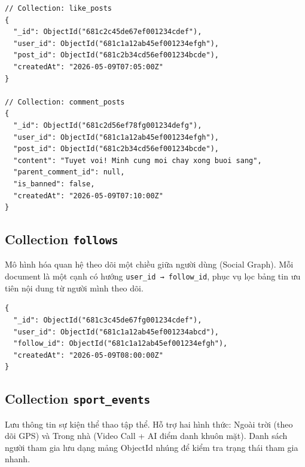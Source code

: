 \begin{verbatim}
// Collection: like_posts
{
  "_id": ObjectId("681c2c45de67ef001234cdef"),
  "user_id": ObjectId("681c1a12ab45ef001234efgh"),
  "post_id": ObjectId("681c2b34cd56ef001234bcde"),
  "createdAt": "2026-05-09T07:05:00Z"
}

// Collection: comment_posts
{
  "_id": ObjectId("681c2d56ef78fg001234defg"),
  "user_id": ObjectId("681c1a12ab45ef001234efgh"),
  "post_id": ObjectId("681c2b34cd56ef001234bcde"),
  "content": "Tuyet voi! Minh cung moi chay xong buoi sang",
  "parent_comment_id": null,
  "is_banned": false,
  "createdAt": "2026-05-09T07:10:00Z"
}
\end{verbatim}

\subsection{Collection \texttt{follows}}
\label{subsec:col_follows}

Mô hình hóa quan hệ theo dõi một chiều giữa người dùng (Social Graph). Mỗi document là một cạnh có hướng \texttt{user\_id → follow\_id}, phục vụ lọc bảng tin ưu tiên nội dung từ người mình theo dõi.

\begin{verbatim}
{
  "_id": ObjectId("681c3c45de67fg001234cdef"),
  "user_id": ObjectId("681c1a12ab45ef001234abcd"),
  "follow_id": ObjectId("681c1a12ab45ef001234efgh"),
  "createdAt": "2026-05-09T08:00:00Z"
}
\end{verbatim}

\subsection{Collection \texttt{sport\_events}}
\label{subsec:col_sport_events}

Lưu thông tin sự kiện thể thao tập thể. Hỗ trợ hai hình thức: Ngoài trời (theo dõi GPS) và Trong nhà (Video Call + AI điểm danh khuôn mặt). Danh sách người tham gia lưu dạng mảng ObjectId nhúng để kiểm tra trạng thái tham gia nhanh.

